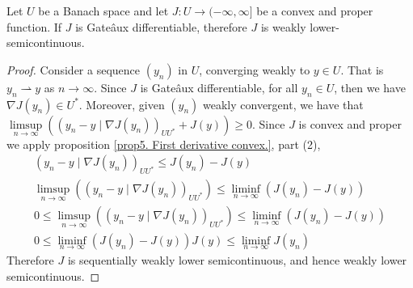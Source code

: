 \begin{theorem}
	Let $U$ be a Banach space and let $J:U\rightarrow (-\infty, \infty]$ be a convex and proper function. If $J$ is Gate\^aux differentiable, therefore $J$ is weakly lower-semicontinuous.
	\begin{proof}
		Consider a sequence $(y_n)$ in $U$,  converging weakly to $y \in U$. That is $y_n \rightharpoonup y$ as $n\rightarrow \infty$.
		Since $J$ is Gate\^aux differentiable, for all $y_n \in U$, then we have $\nabla J(y_n) \in U^*$. Moreover, given $(y_n)$ weakly convergent, we have that $ \underset{n\rightarrow\infty}{\limsup} \left(\left(y_n-y\mid \nabla J(y_n)\right)_{UU^*}+ J(y)\right) \geq 0$. Since $J$ is convex and proper we apply proposition \eqref{prop5. First derivative convex.}, part (2), 
		\begin{align*}
			\left(y_n-y\mid \nabla J(y_n)\right)_{UU^*}\leq J(y_n) -J(y)\\
			\underset{n\rightarrow\infty}{\limsup} \left(\left(y_n-y\mid \nabla J(y_n)\right)_{UU^*}\right)\leq \underset{n\rightarrow\infty}{\liminf}  \left(J(y_n)-J(y)\right)\\
			0\leq \underset{n\rightarrow\infty}{\limsup} \left(\left(y_n-y\mid \nabla J(y_n)\right)_{UU^*}\right)\leq \underset{n\rightarrow\infty}{\liminf}  \left(J(y_n)-J(y)\right) \\
			0\leq \underset{n\rightarrow\infty}{\liminf}  \left(J(y_n)-J(y)\right)
			J(y)\leq \underset{n\rightarrow\infty}{\liminf} J(y_n)
		\end{align*} 
		Therefore $J$ is sequentially weakly lower semicontinuous, and hence weakly lower semicontinuous. 
	\end{proof}
\end{theorem}



